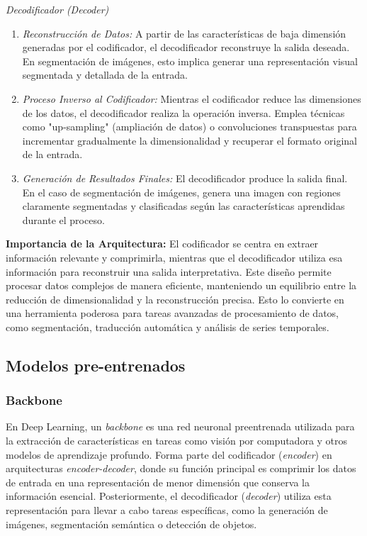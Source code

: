\textit{Decodificador (Decoder)}

\begin{enumerate}

    \item \emph{Reconstrucción de Datos:} A partir de las características de baja dimensión generadas por el codificador, el decodificador reconstruye la salida deseada. En segmentación de imágenes, esto implica generar una representación visual segmentada y detallada de la entrada.

    \item \emph{Proceso Inverso al Codificador:} Mientras el codificador reduce las dimensiones de los datos, el decodificador realiza la operación inversa. Emplea técnicas como "up-sampling" (ampliación de datos) o convoluciones transpuestas para incrementar gradualmente la dimensionalidad y recuperar el formato original de la entrada.

    \item \emph{Generación de Resultados Finales:} El decodificador produce la salida final. En el caso de segmentación de imágenes, genera una imagen con regiones claramente segmentadas y clasificadas según las características aprendidas durante el proceso.


\end{enumerate}

\textbf{Importancia de la Arquitectura:} El codificador se centra en extraer información relevante y comprimirla, mientras que el decodificador utiliza esa información para reconstruir una salida interpretativa. Este diseño permite procesar datos complejos de manera eficiente, manteniendo un equilibrio entre la reducción de dimensionalidad y la reconstrucción precisa. Esto lo convierte en una herramienta poderosa para tareas avanzadas de procesamiento de datos, como segmentación, traducción automática y análisis de series temporales.

\subsection{Modelos pre-entrenados}

\subsubsection{Backbone}

En Deep Learning, un \textit{backbone} es una red neuronal preentrenada utilizada para la extracción de características en tareas como visión por computadora y otros modelos de aprendizaje profundo. Forma parte del codificador (\textit{encoder}) en arquitecturas \textit{encoder-decoder}, donde su función principal es comprimir los datos de entrada en una representación de menor dimensión que conserva la información esencial. Posteriormente, el decodificador (\textit{decoder}) utiliza esta representación para llevar a cabo tareas específicas, como la generación de imágenes, segmentación semántica o detección de objetos.


